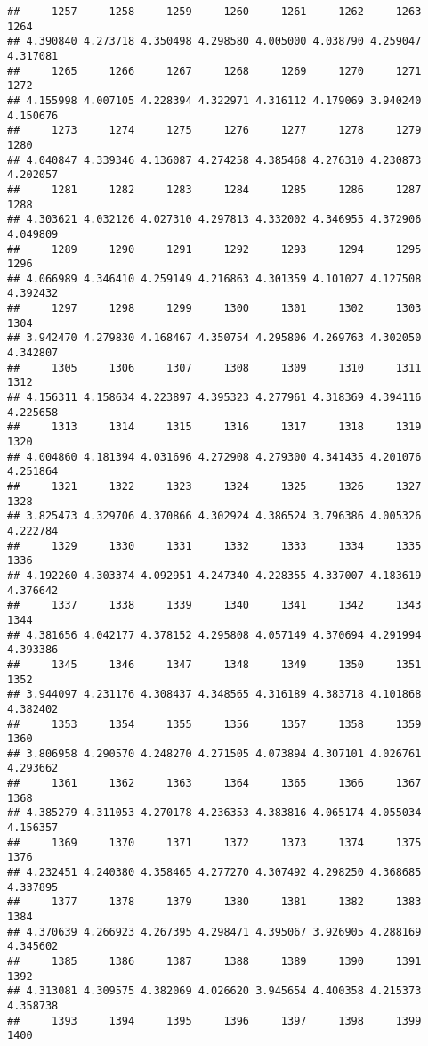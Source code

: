 \documentclass[
]{article}
\begin{document}
\begin{verbatim}
##     1257     1258     1259     1260     1261     1262     1263     1264 
## 4.390840 4.273718 4.350498 4.298580 4.005000 4.038790 4.259047 4.317081 
##     1265     1266     1267     1268     1269     1270     1271     1272 
## 4.155998 4.007105 4.228394 4.322971 4.316112 4.179069 3.940240 4.150676 
##     1273     1274     1275     1276     1277     1278     1279     1280 
## 4.040847 4.339346 4.136087 4.274258 4.385468 4.276310 4.230873 4.202057 
##     1281     1282     1283     1284     1285     1286     1287     1288 
## 4.303621 4.032126 4.027310 4.297813 4.332002 4.346955 4.372906 4.049809 
##     1289     1290     1291     1292     1293     1294     1295     1296 
## 4.066989 4.346410 4.259149 4.216863 4.301359 4.101027 4.127508 4.392432 
##     1297     1298     1299     1300     1301     1302     1303     1304 
## 3.942470 4.279830 4.168467 4.350754 4.295806 4.269763 4.302050 4.342807 
##     1305     1306     1307     1308     1309     1310     1311     1312 
## 4.156311 4.158634 4.223897 4.395323 4.277961 4.318369 4.394116 4.225658 
##     1313     1314     1315     1316     1317     1318     1319     1320 
## 4.004860 4.181394 4.031696 4.272908 4.279300 4.341435 4.201076 4.251864 
##     1321     1322     1323     1324     1325     1326     1327     1328 
## 3.825473 4.329706 4.370866 4.302924 4.386524 3.796386 4.005326 4.222784 
##     1329     1330     1331     1332     1333     1334     1335     1336 
## 4.192260 4.303374 4.092951 4.247340 4.228355 4.337007 4.183619 4.376642 
##     1337     1338     1339     1340     1341     1342     1343     1344 
## 4.381656 4.042177 4.378152 4.295808 4.057149 4.370694 4.291994 4.393386 
##     1345     1346     1347     1348     1349     1350     1351     1352 
## 3.944097 4.231176 4.308437 4.348565 4.316189 4.383718 4.101868 4.382402 
##     1353     1354     1355     1356     1357     1358     1359     1360 
## 3.806958 4.290570 4.248270 4.271505 4.073894 4.307101 4.026761 4.293662 
##     1361     1362     1363     1364     1365     1366     1367     1368 
## 4.385279 4.311053 4.270178 4.236353 4.383816 4.065174 4.055034 4.156357 
##     1369     1370     1371     1372     1373     1374     1375     1376 
## 4.232451 4.240380 4.358465 4.277270 4.307492 4.298250 4.368685 4.337895 
##     1377     1378     1379     1380     1381     1382     1383     1384 
## 4.370639 4.266923 4.267395 4.298471 4.395067 3.926905 4.288169 4.345602 
##     1385     1386     1387     1388     1389     1390     1391     1392 
## 4.313081 4.309575 4.382069 4.026620 3.945654 4.400358 4.215373 4.358738 
##     1393     1394     1395     1396     1397     1398     1399     1400 

\end{verbatim}
\end{document}
